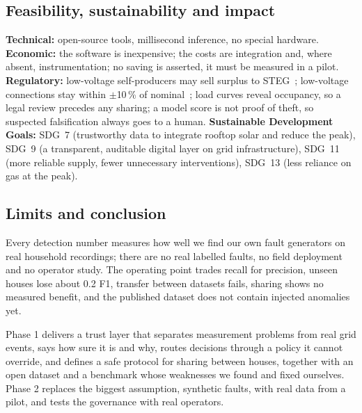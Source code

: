 \subsection{Feasibility, sustainability and impact}
\textbf{Technical:} open-source tools, millisecond inference, no special hardware. \textbf{Economic:} the software is inexpensive; the costs are integration and, where absent, instrumentation; no saving is asserted, it must be measured in a pilot. \textbf{Regulatory:} low-voltage self-producers may sell surplus to STEG~\cite{decree}; low-voltage connections stay within $\pm$10\,\% of nominal~\cite{lvcode}; load curves reveal occupancy, so a legal review precedes any sharing; a model score is not proof of theft, so suspected falsification always goes to a human. \textbf{Sustainable Development Goals:} SDG~7 (trustworthy data to integrate rooftop solar and reduce the peak), SDG~9 (a transparent, auditable digital layer on grid infrastructure), SDG~11 (more reliable supply, fewer unnecessary interventions), SDG~13 (less reliance on gas at the peak).

\subsection{Limits and conclusion}
Every detection number measures how well we find our own fault generators on real household recordings; there are no real labelled faults, no field deployment and no operator study. The operating point trades recall for precision, unseen houses lose about 0.2 F1, transfer between datasets fails, sharing shows no measured benefit, and the published dataset does not contain injected anomalies yet.

Phase 1 delivers a trust layer that separates measurement problems from real grid events, says how sure it is and why, routes decisions through a policy it cannot override, and defines a safe protocol for sharing between houses, together with an open dataset and a benchmark whose weaknesses we found and fixed ourselves. Phase 2 replaces the biggest assumption, synthetic faults, with real data from a pilot, and tests the governance with real operators.
